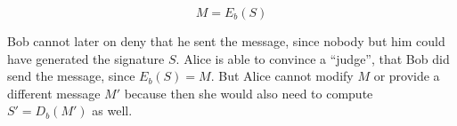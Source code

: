 \begin{equation*}
  \label{eq:validate-signature}
  M = E_b(S)
\end{equation*}

Bob cannot  later on deny that he  sent the message, since  nobody but him
could  have generated  the signature  $S$.  Alice  is able  to  convince a
``judge'', that  Bob did send the  message, since $E_b(S) =  M$. But Alice
cannot modify  $M$ or  provide a different  message $M'$ because  then she
would also need to compute $S' = D_b(M')$ as well.

